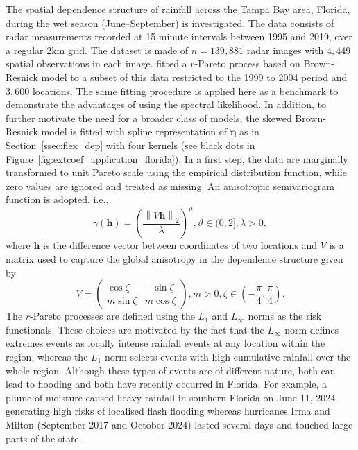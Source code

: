 \documentclass[12pt]{article}
\begin{document}
The spatial dependence structure of rainfall across the Tampa Bay area, Florida, during the wet season (June--September) is investigated. The data consists of radar measurements recorded at 15 minute intervals between 1995 and 2019, over a regular 2km grid. The dataset is made of $n=139,881$ radar images with $4,449$ spatial observations in each image.
%
\cite{deFondeville.Davison:2018} fitted a $r$-Pareto process based on Brown-Resnick model to a subset of this data restricted to the 1999 to 2004 period and $3,600$ locations. 
%
The same fitting procedure is applied here as a benchmark to demonstrate the advantages of using the spectral likelihood. In addition, to further motivate the need for a broader class of models, the skewed Brown-Resnick model is fitted with spline representation of $\bm\eta$ as in Section~\ref{ssec:flex_dep} with four kernels (see black dots in Figure~\ref{fig:extcoef_application_florida}).
%
In a first step, the data are marginally transformed to unit Pareto scale using the empirical distribution function, while zero values are ignored and treated as missing. 
%
An anisotropic semivariogram function is adopted, i.e.,
%
\begin{equation*}
    \gamma(\bm h) = \left(\frac{\left\| V \bm h\right\|_2}{\lambda}\right)^\vartheta, \vartheta\in(0,2],\lambda>0,
\end{equation*}
%
where $\bm h$ is the difference vector between coordinates of two locations and $V$ is a matrix used to capture the global anisotropy in the dependence structure given by
%
\begin{equation}
\label{eq:aniso_mat}
    V = \begin{pmatrix}
    \cos\zeta & - \sin\zeta\\
    m\sin\zeta &  m\cos\zeta
    \end{pmatrix}, m >0 , \zeta\in (-\frac{\pi}{4},\frac{\pi}{4}).
\end{equation}
%
The $r$-Pareto processes are defined using the $L_1$ and $L_\infty$ norms as the risk functionals. These choices are motivated by the fact that the $L_\infty$ norm defines extremes events as locally intense rainfall events at any location within the region, whereas the $L_1$ norm selects events with high cumulative rainfall over the whole region. Although these types of events are of different nature, both can lead to flooding and both have recently occurred in Florida. For example, a plume of moisture caused heavy rainfall in southern Florida on June 11, 2024 generating high risks of localised flash flooding whereas hurricanes Irma and Milton (September 2017 and October 2024) lasted several days and touched large parts of the state. 
\end{document}
